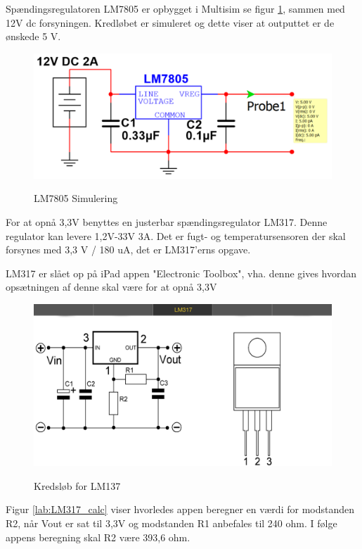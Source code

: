 Spændingsregulatoren LM7805 er opbygget i Multisim se figur \ref{lab:LM7805_SIMULERING}, sammen med 12V dc forsyningen. Kredløbet er simuleret og dette viser at outputtet er de ønskede 5 V.

\begin{figure}[H] \centering
{\includegraphics[width=\textwidth]{filer/design/Billeder/LM7805_SIMULATION}}
\caption{LM7805 Simulering}
\label{lab:LM7805_SIMULERING}
\raggedright
\end{figure}


For at opnå 3,3V benyttes en justerbar spændingsregulator LM317. Denne regulator kan levere 1,2V-33V 3A. Det er fugt- og temperatursensoren der skal forsynes med 3,3 V / 180 uA, det er LM317'erns opgave. 

LM317 er slået op på iPad appen "Electronic Toolbox", vha. denne gives hvordan opsætningen af denne skal være for at opnå 3,3V 
 
\begin{figure}[H] \centering
{\includegraphics[width=\textwidth]{filer/design/Billeder/LM317}}
\caption{Kredsløb for LM137}
\label{lab:LM317}
\raggedright
\end{figure}

Figur \ref{lab:LM317_calc} viser hvorledes appen beregner en værdi for modstanden R2, når Vout er sat til 3,3V og modstanden R1 anbefales til 240 ohm. I følge appens beregning skal R2 være 393,6 ohm.

